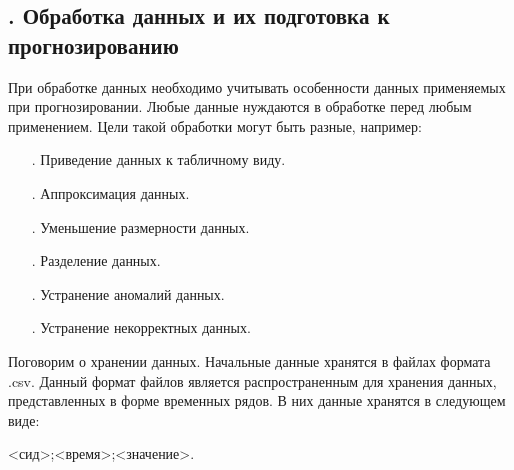 \subtitlespace

\subsection*{ 
  \gostTitleFont
  \redline
  \thechaptercntr .\thesubchaptercntr \spc
  Обработка данных и их подготовка к прогнозированию
} \addtocounter{subchaptercntr}{1}

\subtitlespace

{\gostFont

  \par \redline При обработке данных необходимо учитывать особенности данных применяемых при прогнозировании. Любые данные нуждаются в обработке перед любым применением.  Цели такой обработки могут быть разные, например: 
  
  \begin{itemize}[leftmargin=2.15cm, labelwidth=0.65cm, labelsep=0.0cm] 
  	
  	\item[\theitemcntr. ] Приведение данных к табличному виду.
  	\addtocounter{itemcntr}{1}
  	
  	\item[\theitemcntr. ] Аппроксимация данных.
  	\addtocounter{itemcntr}{1}
  	
  	\item[\theitemcntr. ] Уменьшение размерности данных.
  	\addtocounter{itemcntr}{1}
  	
  	\item[\theitemcntr. ] Разделение данных.
  	\addtocounter{itemcntr}{1}
  	
  	\item[\theitemcntr. ] Устранение аномалий данных.
  	\addtocounter{itemcntr}{1}
  	
  	\item[\theitemcntr. ] Устранение некорректных данных.
  	\addtocounter{itemcntr}{1}
  	
  	\setcounter{itemcntr}{1}
  \end{itemize}

  \par \redline Поговорим о хранении данных. Начальные данные хранятся в файлах формата .csv. Данный формат файлов является распространенным для хранения данных, представленных в форме временных рядов. В них данные хранятся в следующем виде: 
  
  \begin{Center}
  <сид>;<время>;<значение>. 
  \end{Center}

}
